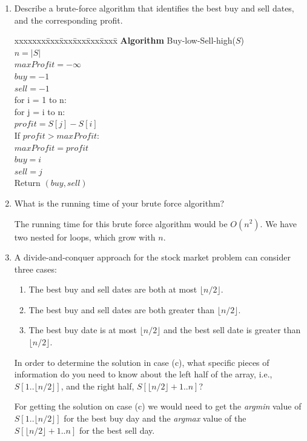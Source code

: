 \documentclass[11pt]{article}
\def\question#1{\red{#1}}
\def\soln#1{\par\blu{#1}} %
\def\blu#1{{\color{blu}#1}}
\def\red#1{{\color{red}#1}}
\begin{document}
\begin{enumerate}
\item \question{Describe a brute-force algorithm that identifies the best buy and sell dates, and the corresponding profit.}
\soln{
  \begin{tabbing}
  xxxxxxx\=xxx\=xxx\=xxx\=xxx\=xxxx\= \kill
  \> {\bf Algorithm} Buy-low-Sell-high($S$) \\
  \>\> $n = |S|$ \\
  \>\> $maxProfit = -\infty$ \\
  \>\> $buy = -1$ \\
  \>\> $sell = -1$ \\
  \>\> for i = 1 to n: \\
  \>\>\> for j = i to n: \\
  \>\>\>\> $profit = S[j] - S[i]$ \\
  \>\>\>\> If $profit > maxProfit:$ \\
  \>\>\>\>\> $maxProfit = profit$ \\
  \>\>\>\>\> $buy = i$ \\
  \>\>\>\>\> $sell = j$ \\
  \>\> Return $(buy, sell)$
  \end{tabbing}
}

\item \question{What is the running time of your brute force algorithm?}
\soln{
  The running time for this brute force algorithm would be $O(n^2)$. We have two nested for loops, 
  which grow with $n$.
}

\item A divide-and-conquer approach for the stock market problem can consider three cases:

\begin{enumerate}
\item The best buy and sell dates are both at most $\lfloor n/2 \rfloor$.
\item The best buy and sell dates are both greater than $\lfloor n/2 \rfloor$.
\item The best buy date is at most $\lfloor n/2 \rfloor$ and the best sell date
      is greater than $\lfloor n/2 \rfloor$.
\end{enumerate}

In order to determine the solution in case (c), \question{what specific pieces of information do you need to know about the left half of the array, i.e., $S[1..\lfloor n/2 \rfloor]$, and the right half, $S[\lfloor n/2 \rfloor+1.. n]$?}
\soln{
  For getting the solution on case (c) we would need to get the \emph{argmin} value of 
  $S[1..\lfloor n/2 \rfloor]$ for the best buy day and the \emph{argmax} value of the 
  $S[\lfloor n/2 \rfloor+1 .. n]$ for the best sell day.
}


\end{enumerate}
\end{document}
